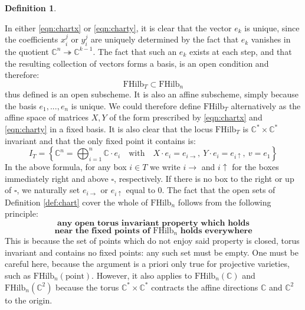 \documentclass[12pt]{amsart}
\numberwithin{equation}{section}
\theoremstyle{definition}
\newtheorem{definition}[theorem]{Definition}
\theoremstyle{remark}
\newcommand{\CC}{\mathbb{C}}
\renewcommand{\1}{\mathbf{1}}
\newcommand{\FH}{\mathrm{FHilb}}
\newcommand{\point}{\mathrm{point}}
\newcommand{\torus}{\CC^{*} \times \CC^*}
\newcommand{\sq}{\square}
\begin{document}
\begin{definition}


\end{definition}

In either \eqref{eqn:chartx} or \eqref{eqn:charty}, it is clear that the vector $e_k$ is unique, since the coefficients $x_i^j$ or $y_i^j$ are uniquely determined by the fact that $e_k$ vanishes in the quotient $\CC^n \twoheadrightarrow \CC^{k-1}$. The fact that such an $e_k$ exists at each step, and that the resulting collection of vectors forms a basis, is an open condition and therefore:
$$
\FH_T \subset \FH_n
$$
thus defined is an open subscheme. It is also an affine subscheme, simply because the basis $e_1,...,e_n$ is unique. We could therefore define $\FH_T$ alternatively as the affine space of matrices $X,Y$ of the form prescribed by \eqref{eqn:chartx} and \eqref{eqn:charty} in a fixed basis. It is also clear that the locus $\FH_T$ is $\torus$ invariant and that the only fixed point it contains is: 
$$
I_T = \left\{\CC^n = \bigoplus_{i=1}^n \CC \cdot e_i \quad \text{with} \quad  X\cdot e_i = e_{i \rightarrow}, \ Y\cdot e_i = e_{i\uparrow}, \ v = e_1 \right\}
$$
In the above formula, for any box $i \in T$ we write $i \rightarrow$ and $i \uparrow$ for the boxes immediately right and above $\sq$, respectively. If there is no box to the right or up of $\sq$, we naturally set $e_{i \rightarrow}$ or $e_{i\uparrow}$ equal to 0. The fact that the open sets of Definition \ref{def:chart} cover the whole of $\FH_n$ follows from the following principle:
\begin{equation}
\label{eqn:principletorus}
\textbf{any open torus invariant property which holds}
\end{equation}
$$
\textbf{near the fixed points of }\FH_n \textbf{ holds everywhere}
$$
This is because the set of points which do not enjoy said property is closed, torus invariant and contains no fixed points: any such set must be empty. One must be careful here, because the argument is a priori only true for projective varieties, such as $\FH_n(\point)$. However, it also applies to $\FH_n(\CC)$ and $\FH_n(\CC^2)$ because the torus $\torus$ contracts the affine directions $\CC$ and $\CC^2$ to the origin. 
\end{document}
